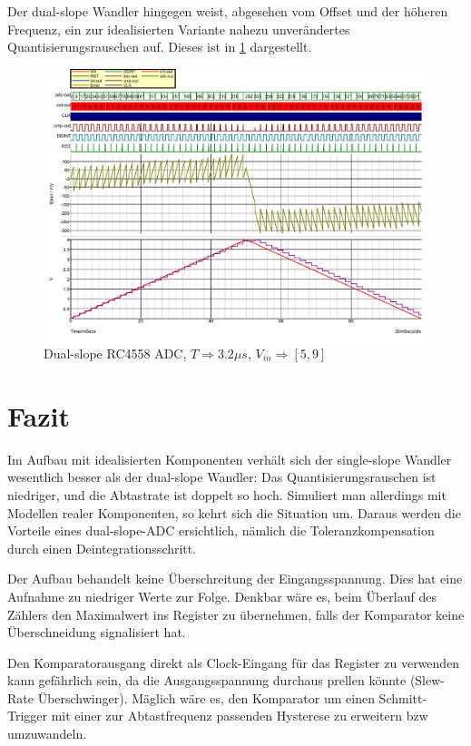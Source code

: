 \documentclass[
	ngerman,
	parskip=half,
	twocolumn,
	DIV=calc,
	]{scrartcl}
\begin{document}
		Der dual-slope Wandler hingegen weist, abgesehen vom Offset und der höheren Frequenz, ein zur idealisierten Variante nahezu unverändertes Quantisierungsrauschen auf. Dieses ist in \cref{fig:dual-slope-RC4558} dargestellt.
	
		\begin{figure}
			\centering
			\includegraphics[width=\linewidth]{RC4558_dual_slope}			
			\caption[Dual-slope RC4558 ADC]{Dual-slope RC4558 ADC, $T \Rightarrow 3.2\mu s$, $V_{in} \Rightarrow [5,  9]$}			
			\label{fig:dual-slope-RC4558}
		\end{figure}
	\section{Fazit}	
		Im Aufbau mit idealisierten Komponenten verhält sich der single-slope Wandler wesentlich besser als der dual-slope Wandler: Das Quantisierungsrauschen  ist niedriger, und die Abtastrate ist doppelt so hoch. Simuliert man allerdings mit Modellen realer Komponenten, so kehrt sich die Situation um. Daraus werden die Vorteile eines dual-slope-ADC ersichtlich, nämlich die Toleranzkompensation durch einen Deintegrationsschritt.
		
		Der Aufbau behandelt keine Überschreitung der Eingangsspannung.  Dies hat eine Aufnahme zu niedriger Werte zur Folge. Denkbar wäre es, beim Überlauf des Zählers den Maximalwert ins Register zu übernehmen, falls der Komparator keine Überschneidung signalisiert hat. 
		
		Den Komparatorausgang direkt als Clock-Eingang für das Register zu verwenden kann gefährlich sein, da die Ausgangsspannung durchaus prellen könnte (Slew-Rate Überschwinger). Mäglich wäre es, den Komparator um einen Schmitt-Trigger\cite{website:schmitt_trigger_slewrate} mit einer zur Abtastfrequenz passenden Hysterese zu erweitern bzw umzuwandeln.
		
\end{document}
